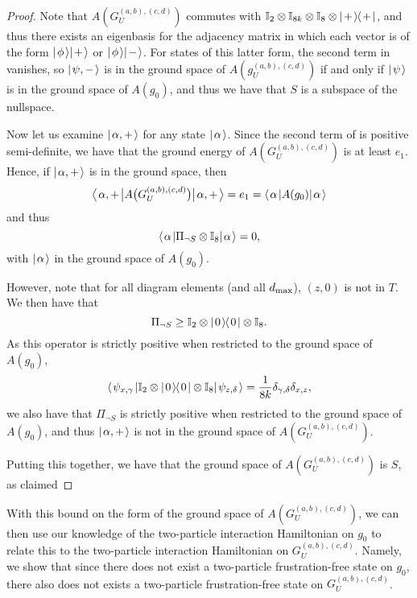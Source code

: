 \documentclass[../thesis-main/thesis-main]{subfiles}
\begin{document}
\begin{proof}
  Note that $A(G_U^{(a,b),(c,d)})$ commutes with $\mathbb{I}_{2}\otimes \mathbb{I}_{8k} \otimes \mathbb{I}_8 \otimes |\mspace{2mu} + \mspace{2mu} \rangle\mspace{-2mu}\langle\mspace{2mu} + \mspace{2mu} |$, and thus there exists an eigenbasis for the adjacency matrix in which each vector is of the form $|\mspace{2mu} \phi \mspace{2mu} \rangle|\mspace{2mu} + \mspace{2mu} \rangle$ or $|\mspace{2mu} \phi \mspace{2mu} \rangle|\mspace{2mu} - \mspace{2mu} \rangle$.   For states of this latter form, the second term in  vanishes, so  $|\mspace{2mu} \psi,- \mspace{2mu} \rangle$ is in the ground space of $A(g_U^{(a,b),(c,d)})$ if and only if $|\mspace{2mu} \psi \mspace{2mu} \rangle$ is in the ground space of $A(g_0)$, and thus we have that $S$ is a subspace of the nullspace.
  
  Now let us examine $|\mspace{2mu} \alpha,+ \mspace{2mu} \rangle$ for any state $|\mspace{2mu} \alpha \mspace{2mu} \rangle$.  Since the second term of  is positive semi-definite, we have that the ground energy of $A(G_U^{(a,b),(c,d)})$ is at least $e_1$.  Hence, if $|\mspace{2mu} \alpha,+ \mspace{2mu} \rangle$ is in the ground space, then 
\begin{equation}
  \big\langle\mspace{2mu} \alpha,+ \mspace{2mu} \big| A\big(G_U^{(a,b),(c,d)}\big) \big|\mspace{2mu} \alpha,+ \mspace{2mu} \big\rangle = e_1 = \langle\mspace{2mu} \alpha \mspace{2mu} | A(g_0) |\mspace{2mu} \alpha \mspace{2mu} \rangle
\end{equation}
and thus 
\begin{equation}
  \langle\mspace{2mu} \alpha \mspace{2mu} | \Pi_{\lnot S}\otimes \mathbb{I}_8 |\mspace{2mu} \alpha \mspace{2mu} \rangle = 0,
\end{equation}
with $|\mspace{2mu} \alpha \mspace{2mu} \rangle$ in the ground space of $A(g_0)$.
  
  However, note that for all diagram elements (and all $d_{\text{max}}$), $(z,0)$ is not in $T$.  We then have that
  \begin{equation}
    \Pi_{\lnot S} \geq \mathbb{I}_2 \otimes |\mspace{2mu} 0 \mspace{2mu} \rangle\mspace{-2mu}\langle\mspace{2mu} 0 \mspace{2mu} | \otimes \mathbb{I}_8.
  \end{equation}
  As this operator is strictly positive when restricted to the ground space of $A(g_0)$,
  \begin{equation}
    \langle\mspace{2mu} \psi_{x,\gamma} \mspace{2mu} | \mathbb{I}_2 \otimes |\mspace{2mu} 0 \mspace{2mu} \rangle\mspace{-2mu}\langle\mspace{2mu} 0 \mspace{2mu} | \otimes \mathbb{I}_8 |\mspace{2mu} \psi_{z,\delta} \mspace{2mu} \rangle = \frac{1}{8k} \delta_{\gamma,\delta} \delta_{x,z},
  \end{equation}
  we also have that  $\Pi_{\lnot S}$ is strictly positive when restricted to the ground space of $A(g_0)$, and thus $|\mspace{2mu} \alpha,+ \mspace{2mu} \rangle$ is not in the ground space of $A(G_U^{(a,b),(c,d)})$.
  
  Putting this together, we have that the ground space of $A(G_U^{(a,b),(c,d)})$ is $S$, as claimed 
\end{proof}

With this bound on the form of the ground space of $A(G_U^{(a,b),(c,d)})$, we can then use our knowledge of the two-particle interaction Hamiltonian on $g_0$ to relate this to the two-particle interaction Hamiltonian on $G_U^{(a,b),(c,d)}$.    Namely, we show that since there does not exist a two-particle frustration-free state on $g_0$, there also does not exists a two-particle frustration-free state on $G_U^{(a,b),(c,d)}$.
\end{document}
